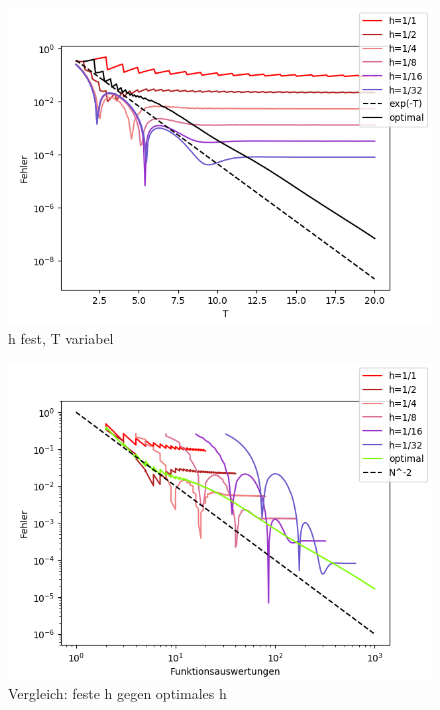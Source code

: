 \begin{figure}[hbt!]
    \centering
    \includegraphics[width=1.2\linewidth]{fehler_T.png}
    \caption{h fest, T variabel}
    \label{fig:my_label}
\end{figure}



\begin{figure}
    \centering
    \includegraphics[width=1.2\linewidth]{optimal.png}
    \caption{Vergleich: feste h gegen optimales h }
    \label{fig:my_label}
\end{figure}
\pagebreak
\FloatBarrier
